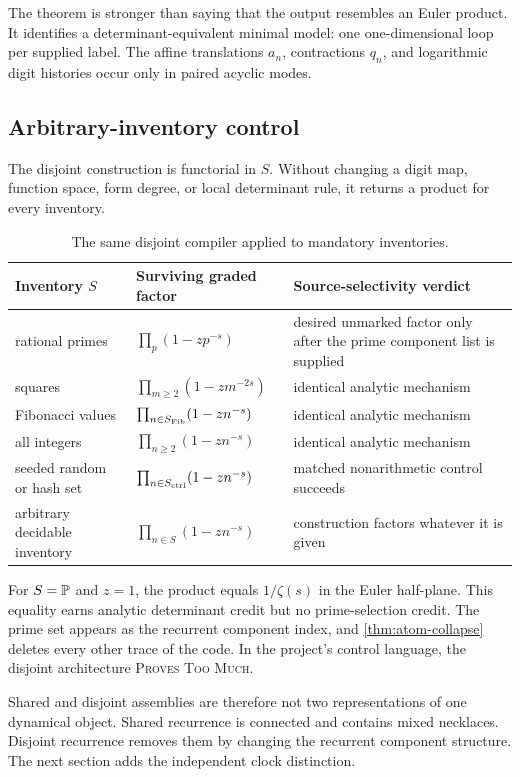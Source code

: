 The theorem is stronger than saying that the output resembles an Euler
product.  It identifies a determinant-equivalent minimal model: one
one-dimensional loop per supplied label.  The affine translations \(a_n\),
contractions \(q_n\), and logarithmic digit histories occur only in paired
acyclic modes.

\subsection{Arbitrary-inventory control}

The disjoint construction is functorial in \(S\).  Without changing a digit
map, function space, form degree, or local determinant rule, it returns a
product for every inventory.

\begin{table}[t]
\centering
\caption{The same disjoint compiler applied to mandatory inventories.}
\label{tab:inventories}
\small
\begin{tabularx}{\textwidth}{L{3.2cm}L{5.1cm}Y}
\toprule
Inventory \(S\) & Surviving graded factor & Source-selectivity verdict \\
\midrule
rational primes
& $\prod_p(1-zp^{-s})$
& desired unmarked factor only after the prime component list is supplied \\
squares
& $\prod_{m\ge2}(1-zm^{-2s})$
& identical analytic mechanism \\
Fibonacci values
& $\prod_{n\in S_{\rm Fib}}(1-zn^{-s})$
& identical analytic mechanism \\
all integers
& $\prod_{n\ge2}(1-zn^{-s})$
& identical analytic mechanism \\
seeded random or hash set
& $\prod_{n\in S_{\rm ctrl}}(1-zn^{-s})$
& matched nonarithmetic control succeeds \\
arbitrary decidable inventory
& $\prod_{n\in S}(1-zn^{-s})$
& construction factors whatever it is given \\
\bottomrule
\end{tabularx}
\end{table}

For \(S=\mathbb P\) and \(z=1\), the product equals \(1/\zeta(s)\) in the Euler
half-plane.  This equality earns analytic determinant credit but no
prime-selection credit.  The prime set appears as the recurrent component
index, and \cref{thm:atom-collapse} deletes every other trace of the code.
In the project's control language, the disjoint architecture
\textsc{Proves Too Much}.

Shared and disjoint assemblies are therefore not two representations of one
dynamical object.  Shared recurrence is connected and contains mixed
necklaces.  Disjoint recurrence removes them by changing the recurrent
component structure.  The next section adds the independent clock
distinction.
